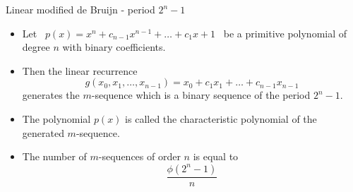 \documentclass[10pt, compress]{beamer}
\begin{document}
\begin{frame}{Linear modified de Bruijn - period ${2^n - 1}$}
\begin{itemize}
\item Let \   $p(x) = x^{n} + c_{n-1}x^{n-1} + \dots + c_{1}x + 1 $ \
be a primitive polynomial of degree $ n $ with binary coefficients.
\item Then the linear recurrence
\[g(x_{0}, x_{1}, \ldots , x_{n-1}) = x_{0} + c_{1}x_{1} + \dots + c_{n-1}x_{n-1} \]
generates the $ m$-sequence which is a binary sequence of the period $ 2^n-1. $
\item The polynomial $p(x) $ is called the characteristic polynomial of the generated $m$-sequence.
\item The number of $m$-sequences of order $n$ is equal to 
\[ \frac{\phi (2^n-1)}{n}   \]
\end{itemize}
\end{frame} 
\end{document}
